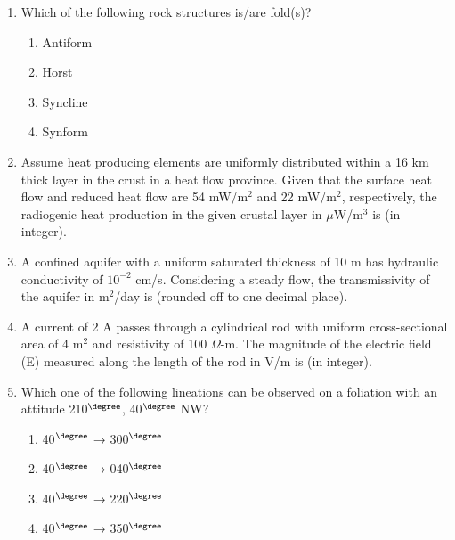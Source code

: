\documentclass[journal,12pt,onecolumn]{IEEEtran}
\begin{document}
\begin{enumerate}
\item Which of the following rock structures is/are fold(s)?  

\hfill{}

\begin{multicols}{2}
\begin{enumerate}
\item Antiform
\item Horst
\item Syncline
\item Synform
\end{enumerate}
\end{multicols}

\item Assume heat producing elements are uniformly distributed within a 16 km thick layer in the crust in a heat flow province. Given that the surface heat flow and reduced heat flow are 54 mW/m$^2$ and 22 mW/m$^2$, respectively, the radiogenic heat production in the given crustal layer in $\mu$W/m$^3$ is  (in integer).  

\hfill{}

\item A confined aquifer with a uniform saturated thickness of 10 m has hydraulic conductivity of $10^{-2}$ cm/s. Considering a steady flow, the transmissivity of the aquifer in m$^2$/day is  (rounded off to one decimal place).  

\hfill{}

\item A current of 2 A passes through a cylindrical rod with uniform cross-sectional area of 4 m$^2$ and resistivity of 100 $\Omega$-m. The magnitude of the electric field (E) measured along the length of the rod in V/m is  (in integer).  

\hfill{}

\item Which one of the following lineations can be observed on a foliation with an attitude 210$^\degree$, 40$^\degree$ NW?  

\hfill{}

\begin{multicols}{2}
\begin{enumerate}
\item 40$^\degree$ → 300$^\degree$
\item 40$^\degree$ → 040$^\degree$
\item 40$^\degree$ → 220$^\degree$
\item 40$^\degree$ → 350$^\degree$
\end{enumerate}
\end{multicols}


\end{enumerate}
\end{document}
